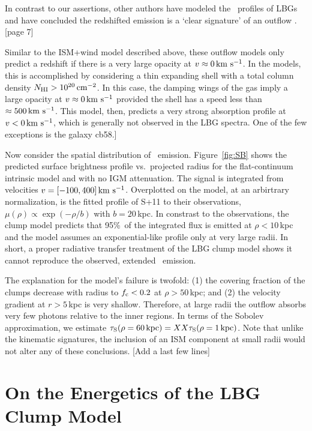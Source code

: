 \documentclass[12pt,preprint]{aastex}
\begin{document}
In contrast to our assertions,
other authors have modeled the \lya\ profiles of LBGs and have
concluded the redshifted emission is a `clear signature' of an outflow
\citep[e.g.][]{verhomme}.  
[page 7]

Similar to the ISM+wind model described above, these outflow models only predict a
redshift if there is a very large opacity at $v \approx 0\, {\rm km~s^{-1}}$.  In
the \cite{verhomme} models, this is accomplished by considering a
thin expanding shell with a total  column density $N_{\rm HI} > 10^{20}
\, {\rm cm^{-2}}$.  In this case, the damping wings of the gas imply a large
opacity at $v \approx 0 \, {\rm km~s^{-1}}$ provided the shell has a speed less
than $\approx 500 \, {\rm km~s^{-1}}$.  This model, then, predicts a very strong
absorption profile at $v < 0 \, {\rm km~s^{-1}}$, which is generally not observed
in the LBG spectra.  One of the few exceptions is the galaxy cb58.]

Now consider the spatial distribution of \lya\ emission.
Figure~\ref{fig:SB} shows the predicted surface brightness profile
vs.\ projected radius for the flat-continuum intrinsic model and with
no IGM attenuation.  The signal is integrated from velocities $v =
[-100,400]\, {\rm km~s^{-1}}$. Overplotted on the model, at an arbirtrary
normalization, is the fitted profile of S+11 to their observations,
$\mu(\rho) \propto \exp(-\rho/b)$ with $b=20$\,kpc.  In constrast to
the observations, the clump model predicts that 95\%\ of the
integrated flux is emitted at $\rho < 10$\,kpc and the model assumes
an exponential-like profile only at very large radii.  In short, a
proper radiative transfer treatment of the LBG clump model shows it
cannot reproduce the observed, extended \lya\ emission.  

The explanation for the model's failure is twofold:  
(1) the covering fraction of the clumps decrease with radius to
$f_{\rm c} < 0.2$ at $\rho > 50$\,kpc; and
(2) the velocity gradient at $r>5$\,kpc is very shallow.  Therefore,
at large radii the outflow absorbs very few photons relative to the
inner regions.  In terms of the Sobolev approximation, we estimate
$\tau_{\rm S}(\rho = 60 \, {\rm kpc}) = XX \tau_{\rm S}(\rho=1\, {\rm
  kpc})$.  
Note that unlike the kinematic signatures, the inclusion of an ISM
component at small radii would not alter any of these conclusions.
[Add a last few lines]


\section{On the Energetics of the LBG Clump Model}
\label{sec:energy}
\end{document}
